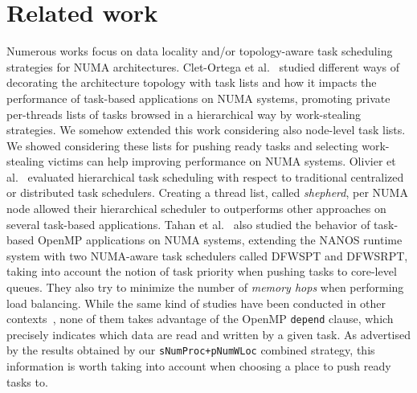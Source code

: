 \documentclass{Styles/llncs}
\begin{document}
\section{Related work}
\label{sec:related-work}

Numerous works focus on data locality and/or topology-aware task scheduling strategies for
NUMA architectures.
Clet-Ortega et al.~\cite{DBLP:conf/europar/Clet-OrtegaCP14} studied different ways of decorating the architecture topology with task lists and how it impacts the performance of task-based applications on NUMA systems, promoting private per-threads lists of tasks browsed in a hierarchical way by work-stealing strategies.
We somehow extended this work considering also node-level task lists. We showed considering these lists for pushing ready tasks and selecting work-stealing victims can help improving performance on NUMA systems.
Olivier et al.~\cite{DBLP:journals/ijhpca/OlivierPWSP12} evaluated hierarchical task scheduling with respect to traditional centralized or distributed task schedulers. Creating a thread list, called \emph{shepherd}, per NUMA node allowed their hierarchical scheduler to outperforms other approaches on several task-based applications.
Tahan et al.~\cite{DBLP:journals/corr/Tahan14} also studied the behavior of task-based OpenMP applications on NUMA systems, extending the NANOS runtime system with two NUMA-aware task schedulers called DFWSPT and DFWSRPT, taking into account the notion of task priority when pushing tasks to core-level queues. They also try to minimize the number of \emph{memory hops} when performing load balancing.
While the same kind of studies have been conducted in other contexts~\cite{DBLP:conf/europar/TerbovenSCM12,DBLP:journals/corr/abs-1101-0093}, none of them takes advantage of the OpenMP \verb/depend/ clause, which precisely indicates which data are read and written by a given task. As advertised by the results obtained by our \verb!sNumProc+pNumWLoc! combined strategy, this information is worth taking into account when choosing a place to push ready tasks to.


\end{document}
